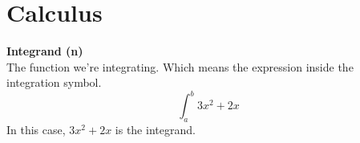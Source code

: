 \section{Calculus}

    \textbf{Integrand (n)} \\
    The function we're integrating. Which means the expression inside the integration symbol.
    $$\int_{a}^{b} 3x^2 + 2x$$ 
    In this case, $3x^2 + 2x$ is the integrand.
    


